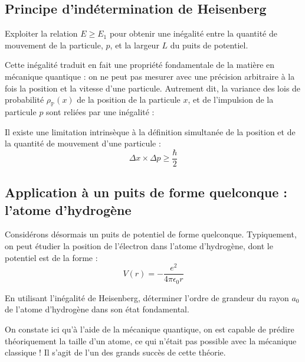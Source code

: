 \documentclass[11pt,fleqn]{book} %
\begin{document}
\subsection{Principe d'indétermination de Heisenberg}

\begin{capex}
	Exploiter la relation $E \ge E_1$ pour obtenir une inégalité entre la quantité de mouvement de la particule, $p$, et la largeur $L$ du puits de potentiel.
\end{capex}

Cette inégalité traduit en fait une propriété fondamentale de la matière en mécanique quantique : on ne peut pas mesurer avec une précision arbitraire à la fois la position et la vitesse d'une particule. Autrement dit, la variance des lois de probabilité $\rho_\mathbb{P}(x)$ de la position de la particule $x$, et de l'impulsion de la particule $p$ sont reliées par une inégalité :
\begin{theorem}
	Il existe une limitation intrinsèque à la définition simultanée de la position et de la quantité de mouvement d'une particule :
	\begin{equation}
		\Delta x \times \Delta p \ge \frac{\hbar}{2}
	\end{equation}
\end{theorem}

\subsection{Application à un puits de forme quelconque : l'atome d'hydrogène}

Considérons désormais un puits de potentiel de forme quelconque. Typiquement, on peut étudier la position de l'électron dans l'atome d'hydrogène, dont le potentiel est de la forme :
\begin{equation}
	V(r) = - \frac{e^2}{4 \pi \epsilon_0 r}
\end{equation}

\begin{capex}
	En utilisant l'inégalité de Heisenberg, déterminer l'ordre de grandeur du rayon $a_0$ de l'atome d'hydrogène dans son état fondamental.
\end{capex}

\begin{remark}
	On constate ici qu'à l'aide de la mécanique quantique, on est capable de prédire théoriquement la taille d'un atome, ce qui n'était pas possible avec la mécanique classique ! Il s'agit de l'un des grands succès de cette théorie.
\end{remark}
\end{document}

